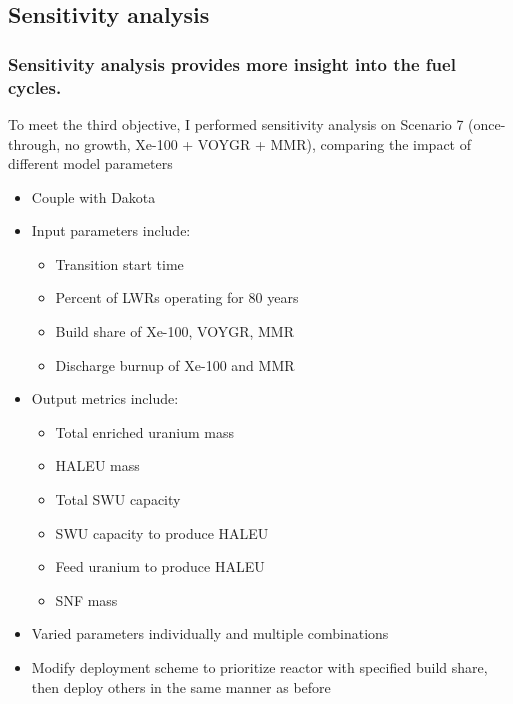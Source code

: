 \subsection{Sensitivity analysis}
\begin{frame}
    \frametitle{Sensitivity analysis provides more insight into 
    the fuel cycles.}
    To meet the third objective, I performed sensitivity analysis 
    on Scenario 7 (once-through, no growth, Xe-100 + VOYGR + MMR), 
    comparing the impact of different model parameters
    \begin{itemize}
        \item Couple \Cyclus with Dakota \cite{adams_dakota_2021}
        \item<2-> Input parameters include:
        \begin{itemize}
            \item<2-> Transition start time
            \item<2-> Percent of \glspl{LWR} operating for 80 years
            \item<2-> Build share of Xe-100, VOYGR, MMR
            \item<2-> Discharge burnup of Xe-100 and MMR
        \end{itemize}
        \item<3-> Output metrics include:
        \begin{itemize}
            \item<3-> Total enriched uranium mass
            \item<3-> HALEU mass
            \item<3-> Total SWU capacity
            \item<3-> SWU capacity to produce HALEU
            \item<3-> Feed uranium to produce HALEU
            \item<3-> \gls{SNF} mass
        \end{itemize}
        \item<4-> Varied parameters individually and multiple combinations
        \item<4-> Modify deployment scheme to prioritize reactor with 
              specified build share, then deploy others in the same 
              manner as before
    \end{itemize}

\end{frame}

